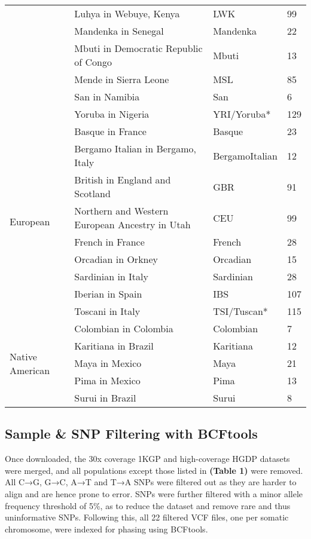 \documentclass[11pt]{article}
\begin{document}
\begin{table}[htb]
\begin{tabular}{ |p{3cm}||p{8cm}|p{3cm}|p{0.8cm}|  }
        &Luhya in Webuye, Kenya & LWK & 99 \\
        &Mandenka in Senegal & Mandenka & 22 \\
        &Mbuti in Democratic Republic of Congo & Mbuti & 13 \\
        &Mende in Sierra Leone & MSL & 85 \\
        &San in Namibia & San & 6 \\
        &Yoruba in Nigeria & YRI/Yoruba* & 129 \\
    \hline
    \multirow{9}{*}{European}
        &Basque in France & Basque & 23 \\
        &Bergamo Italian in Bergamo, Italy & BergamoItalian & 12 \\
        &British in England and Scotland & GBR & 91 \\
        &Northern and Western European Ancestry in Utah & CEU & 99 \\
        &French in France & French & 28 \\
        &Orcadian in Orkney & Orcadian & 15 \\
        &Sardinian in Italy & Sardinian & 28 \\
        &Iberian in Spain & IBS & 107 \\
        &Toscani in Italy & TSI/Tuscan* & 115 \\
    \hline
    \multirow{5}{*}{Native American}
        &Colombian in Colombia & Colombian & 7 \\
        &Karitiana in Brazil & Karitiana & 12 \\
        &Maya in Mexico & Maya & 21 \\
        &Pima in Mexico & Pima & 13 \\
        &Surui in Brazil & Surui & 8 \\
    \hline
    \end{tabular}
\end{table}






\subsection{Sample \& SNP Filtering with BCFtools}

Once downloaded, the 30x coverage 1KGP and high-coverage HGDP datasets were merged, and all populations except those listed in \textbf{(Table 1)} were removed. All C→G, G→C, A→T and T→A SNPs were filtered out as they are harder to align and are hence prone to error. SNPs were further filtered with a minor allele frequency threshold of 5\%, as to reduce the dataset and remove rare and thus uninformative SNPs. Following this, all 22 filtered VCF files, one per somatic chromosome, were indexed for phasing using BCFtools.
\end{document}
